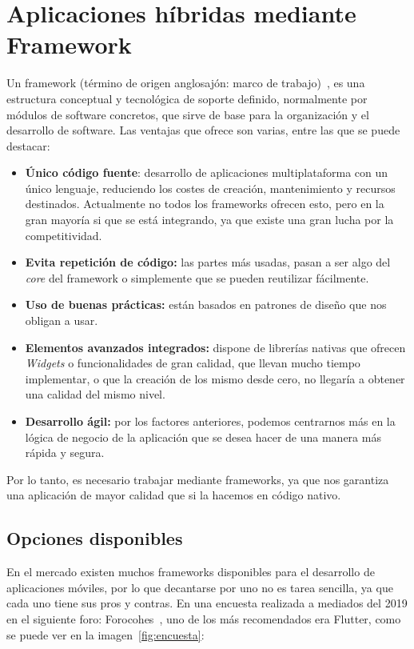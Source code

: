 \section{Aplicaciones híbridas mediante Framework}
Un framework (término de origen anglosajón: marco de trabajo)~\cite{wiki:framework}, es una estructura conceptual y tecnológica de soporte definido, normalmente por módulos de software concretos, que sirve de base para la organización y el desarrollo de software. Las ventajas que ofrece son varias, entre las que se puede destacar:

\begin{itemize}
	\item \textbf{Único código fuente}: desarrollo de aplicaciones multiplataforma con un único lenguaje, reduciendo los costes de creación, mantenimiento y recursos destinados. Actualmente no todos los frameworks ofrecen esto, pero en la gran mayoría si que se está integrando, ya que existe una gran lucha por la competitividad.
	\item \textbf{Evita repetición de código:} las partes más usadas, pasan a ser algo del \emph{core} del framework o simplemente que se pueden reutilizar fácilmente. 
	\item \textbf{Uso de buenas prácticas:} están basados en patrones de diseño que nos obligan a usar.
	\item \textbf{Elementos avanzados integrados:} dispone de librerías nativas que ofrecen \emph{Widgets} o funcionalidades de gran calidad, que llevan mucho tiempo implementar, o que la creación de los mismo desde cero, no llegaría a obtener una calidad del mismo nivel.
	\item \textbf{Desarrollo ágil:} por los factores anteriores, podemos centrarnos más en la lógica de negocio de la aplicación que se desea hacer de una manera más rápida y segura.
\end{itemize}

Por lo tanto, es necesario trabajar mediante frameworks, ya que nos garantiza una aplicación de mayor calidad que si la hacemos en código nativo.

\subsection{Opciones disponibles}
En el mercado existen muchos frameworks disponibles para el desarrollo de aplicaciones móviles, por lo que decantarse por uno no es tarea sencilla, ya que cada uno tiene sus pros y contras. En una encuesta realizada a mediados del 2019 en el siguiente foro: Forocohes~\cite{foro:encuesta}, uno de los más recomendados era Flutter, como se puede ver en la imagen~\ref{fig:encuesta}:

